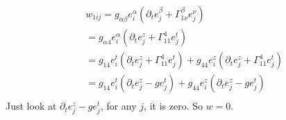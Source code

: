 \begin{equation}
\begin{split}
&w_{1 ij}=g_{\alpha \beta}e_i^{\alpha}(\partial _{t}e_j^{\beta}+\Gamma ^{\beta}_{1\nu}e_j^{\nu})\\
&=g_{\alpha 4}e_i^{\alpha}(\partial _{t}e_j^{z}+\Gamma ^{4}_{11}e_j^{t})\\
&=g_{1 4}e_i^{t}(\partial _{t}e_j^{z}+\Gamma ^{4}_{11}e_j^{t})+g_{4 4}e_i^{z}(\partial _{t}e_j^{z}+\Gamma ^{4}_{11}e_j^{t})\\
&=g_{1 4}e_i^{t}(\partial _{t}e_j^{z}-ge_j^{t})+g_{4 4}e_i^{z}(\partial _{t}e_j^{z}-ge_j^{t})\\
\end{split}
\end{equation}
Just look at $\partial _{t}e_j^{z}-ge_j^{t}$, for any $j$, it is zero. So $w=0$.

